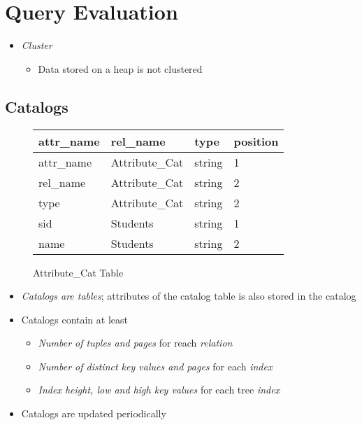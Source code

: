 \chapter{Query Evaluation}

  \begin{itemize}
    \item \emph{Cluster}
    \begin{itemize}
      \item Data stored on a heap is not clustered
    \end{itemize}
  \end{itemize}

\section{Catalogs}

  \begin{figure}
    \centering
    \caption{Attribute\_Cat Table}
    \begin{tabu} to \columnwidth{| X[1, l] | X[1, l] | X[1, l] | X[1, l] |}
      \hline
      \bfseries{attr\_name} & \bfseries{rel\_name} & \bfseries{type} & \bfseries{position} \\ \hline \hline
      attr\_name & Attribute\_Cat & string & 1 \\ \hline
      rel\_name & Attribute\_Cat & string & 2 \\ \hline
      type & Attribute\_Cat & string & 2 \\ \hline
      sid & Students & string & 1 \\ \hline
      name & Students & string & 2 \\ \hline
    \end{tabu}
  \end{figure}

  \begin{itemize}
    \item \emph{Catalogs are tables}; attributes of the catalog table is also
    stored in the catalog
    \item Catalogs contain at least
    \begin{itemize}
      \item \emph{Number of tuples and pages} for reach \emph{relation}
      \item \emph{Number of distinct key values and pages} for each \emph{index}
      \item \emph{Index height, low and high key values} for each tree \emph{index}
    \end{itemize}

    \item Catalogs are updated periodically
  \end{itemize}

